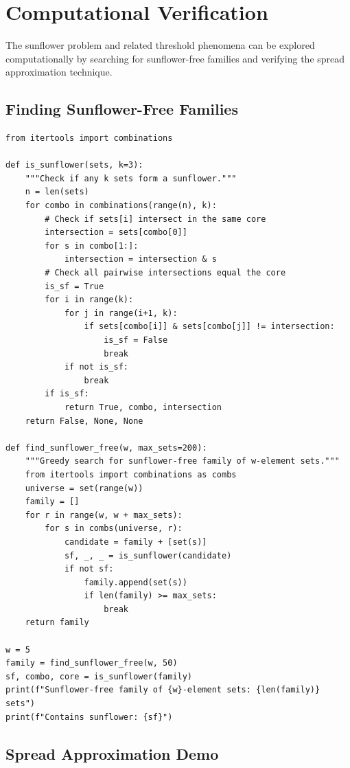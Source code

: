 \section{Computational Verification}

The sunflower problem and related threshold phenomena can be explored computationally by searching for sunflower-free families and verifying the spread approximation technique.

\subsection{Finding Sunflower-Free Families}

\begin{verbatim}
from itertools import combinations

def is_sunflower(sets, k=3):
    """Check if any k sets form a sunflower."""
    n = len(sets)
    for combo in combinations(range(n), k):
        # Check if sets[i] intersect in the same core
        intersection = sets[combo[0]]
        for s in combo[1:]:
            intersection = intersection & s
        # Check all pairwise intersections equal the core
        is_sf = True
        for i in range(k):
            for j in range(i+1, k):
                if sets[combo[i]] & sets[combo[j]] != intersection:
                    is_sf = False
                    break
            if not is_sf:
                break
        if is_sf:
            return True, combo, intersection
    return False, None, None

def find_sunflower_free(w, max_sets=200):
    """Greedy search for sunflower-free family of w-element sets."""
    from itertools import combinations as combs
    universe = set(range(w))
    family = []
    for r in range(w, w + max_sets):
        for s in combs(universe, r):
            candidate = family + [set(s)]
            sf, _, _ = is_sunflower(candidate)
            if not sf:
                family.append(set(s))
                if len(family) >= max_sets:
                    break
    return family

w = 5
family = find_sunflower_free(w, 50)
sf, combo, core = is_sunflower(family)
print(f"Sunflower-free family of {w}-element sets: {len(family)} sets")
print(f"Contains sunflower: {sf}")
\end{verbatim}

\subsection{Spread Approximation Demo}

